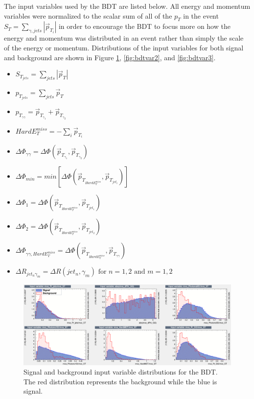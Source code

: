  The input variables used by the BDT are listed below.  All energy and momentum variables were normalized to the scalar sum of all of the $p_T$ in the event $S_T = \sum_{\gamma,jets} |\vec{p}_{T_i}|$ in order to encourage the BDT to focus more on how the energy and momentum was distributed in an event rather than simply the scale of the energy or momentum.  Distributions of the input variables for both signal and background are shown in Figure \ref{fig:bdtvar1}, \ref{fig:bdtvar2}, and \ref{fig:bdtvar3}.

\begin{itemize}
	\item $S_{T_{jets}} = \sum_{jets}|\vec{p}_T|$
	\item $p_{T_{jets}} = \sum_{jets}\vec{p}_T$
	\item $p_{T_{\gamma \gamma}} = \vec{p}_{T_{\gamma_1}} + \vec{p}_{T_{\gamma_2}}$
	\item $HardE_T^{miss} = -\sum_{i}\vec{p}_{T_{i}}$
	\item $\Delta \Phi_{\gamma \gamma} = \Delta \Phi (\vec{p}_{T_{\gamma_1}}, \vec{p}_{T_{\gamma_2}})$
	\item $\Delta \Phi_{min} = min[\Delta \Phi (\vec{p}_{T_{HardE_T^{miss}}}, \vec{p}_{T_{jet_i}})]$
	\item $\Delta \Phi_{1} = \Delta \Phi (\vec{p}_{T_{HardE_T^{miss}}}, \vec{p}_{T_{jet_1}})$
	\item $\Delta \Phi_{2} = \Delta \Phi (\vec{p}_{T_{HardE_T^{miss}}}, \vec{p}_{T_{jet_2}})$
	\item $\Delta \Phi_{\gamma \gamma, HardE_T^{miss}} = \Delta \Phi (\vec{p}_{T_{HardE_T^{miss}}}, \vec{p}_{T_{\gamma \gamma}})$
	\item $\Delta R_{jet_n\gamma_m} = \Delta R(jet_n, \gamma_m) \text{ for } n=1,2 \text{ and } m=1,2$
\end{itemize}

\begin{figure}[h]
	\centering
	\includegraphics[width=1.7\linewidth, height=0.5\textheight, angle=90]{Figures/BDTvar1}
	\caption[BDT input variables 1]{Signal and background input variable distributions for the BDT.  The red distribution represents the background while the blue is signal.}
	\label{fig:bdtvar1}
\end{figure}

